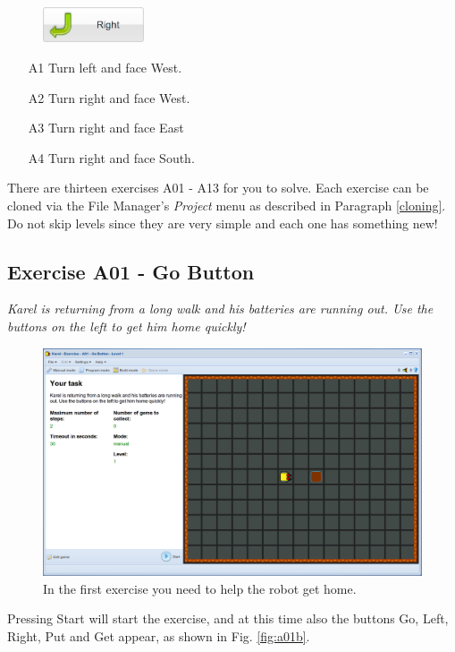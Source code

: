 \documentclass[article,A4,12pt]{llncs}
\begin{document}
\begin{enumerate}
\begin{figure}[!ht]
\begin{center}
\includegraphics[width=3cm]{img/button-right-4.png}
\end{center}
\end{figure}
\begin{enumerate}
\item[A1] Turn left and face West.
\item[A2] Turn right and face West.
\item[A3] Turn right and face East
\item[A4] Turn right and face South.
\end{enumerate}
\end{enumerate}
There are thirteen exercises A01 - A13 for you to solve.
Each exercise can be cloned via the File Manager's 
{\em Project} menu as described in Paragraph \ref{cloning}. 
Do not skip levels since they are very simple and each one has something new! 

\newpage
\subsection{Exercise A01 - Go Button}

{\em Karel is returning from a long walk and his batteries are running out. 
Use the buttons on the left to get him home quickly! }

\begin{figure}[!ht]
\begin{center}
\includegraphics[height=0.4\textwidth]{img/a01.png}
\end{center}
\vspace{-4mm}
\caption{In the first exercise you need to help the robot get home.}
\label{fig:a01}
\end{figure}
\noindent
Pressing Start will start 
the exercise, and at this time also the buttons Go, Left, Right, Put and Get appear, 
as shown in Fig. \ref{fig:a01b}.
\end{document}
